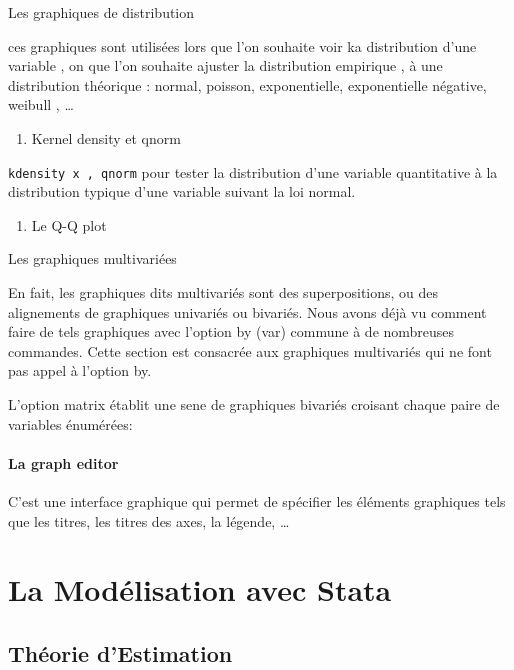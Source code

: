 \documentclass[
]{book}
\providecommand{\tightlist}{%
  \setlength{\itemsep}{0pt}\setlength{\parskip}{0pt}}
\begin{document}
Les graphiques de distribution

ces graphiques sont utilisées lors que l'on souhaite voir ka distribution d'une variable , on que l'on souhaite ajuster la distribution empirique , à une distribution théorique : normal, poisson, exponentielle, exponentielle négative, weibull , \ldots{}

\begin{enumerate}
\def\labelenumi{(\arabic{enumi})}
\tightlist
\item
  Kernel density et qnorm
\end{enumerate}

\texttt{kdensity\ x\ ,\ qnorm} pour tester la distribution d'une variable quantitative à la distribution typique d'une variable suivant la loi normal.

\begin{enumerate}
\def\labelenumi{(\arabic{enumi})}
\setcounter{enumi}{1}
\tightlist
\item
  Le Q-Q plot
\end{enumerate}

Les graphiques multivariées

En fait, les graphiques dits multivariés sont des superpositions,
ou des alignements de graphiques univariés ou bivariés. Nous
avons déjà vu comment faire de tels graphiques avec l'option
by (var) commune à de nombreuses commandes. Cette section
est consacrée aux graphiques multivariés qui ne font pas appel à
l'option by.

L'option matrix établit une sene de graphiques bivariés
croisant chaque paire de variables énumérées:

\hypertarget{la-graph-editor}{%
\subsubsection{La graph editor}\label{la-graph-editor}}

C'est une interface graphique qui permet de spécifier les éléments graphiques tels que les titres, les titres des axes, la légende, \ldots{}

\hypertarget{la-moduxe9lisation-avec-stata}{%
\chapter{La Modélisation avec Stata}\label{la-moduxe9lisation-avec-stata}}

\hypertarget{thuxe9orie-destimation}{%
\section{Théorie d'Estimation}\label{thuxe9orie-destimation}}
\end{document}
